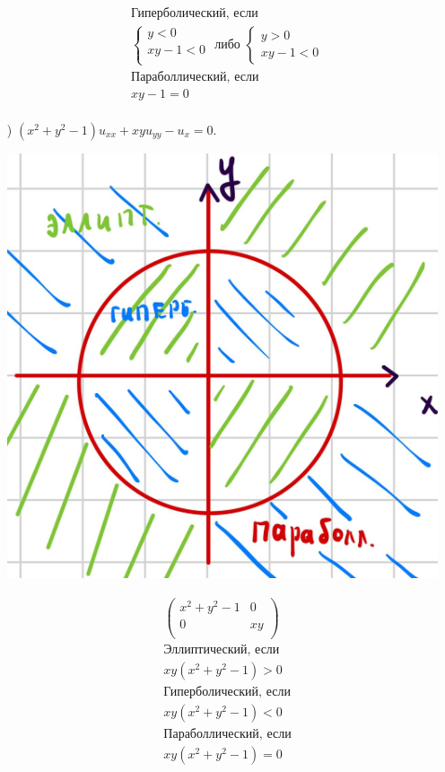 \begin{enumerate}
\begin{minipage}{0.6\textwidth}
\begin{align*}
&\text{Гиперболический, если} \\ 
& \begin{cases}
 y < 0 \\ xy-1<0 \\ 
 \end{cases} \text{ либо } \begin{cases}
  y>0 \\ xy-1<0
\end{cases}\\
&\text{Параболлический, если} \\
&xy-1=0 \\ 
\end{align*}
\end{minipage}
\newpage
\item[\text{б})] $(x^{2}+y^{2}-1)u_{xx}+xyu_{yy}-u_{x} = 0.$ \\
  \begin{minipage}{0.3\textwidth}
  \includegraphics[width=1.3\linewidth]{pictures/u2.jpg} 
  \end{minipage}
  \begin{minipage}{0.6\textwidth}\raggedleft
\begin{align*}
&\begin{pmatrix}
x^{2}+y^{2}-1 & 0 \\
0 & xy \\
\end{pmatrix} \\
&\text{Эллиптический, если} \\ 
&xy(x^{2}+y^{2}-1) > 0\\
&\text{Гиперболический, если} \\ 
&xy(x^{2}+y^{2}-1) < 0\\
&\text{Параболлический, если} \\ 
&xy(x^{2}+y^{2}-1) = 0\\
\end{align*}
  \end{minipage}
\end{enumerate}
